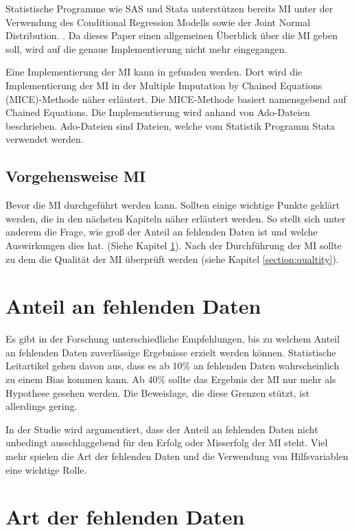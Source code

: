 Statistische Programme wie SAS und Stata unterstützen bereits MI unter der Verwendung des Conditional Regression Modells 
sowie der Joint Normal Distribution. \autocite[164]{Lee2014}. Da dieses Paper einen allgemeinen Überblick über die MI 
geben soll, wird auf die genaue Implementierung nicht mehr eingegangen. 

Eine Implementierung der MI kann in \textcite[]{Royston2005} gefunden werden. Dort wird die Implementierung der MI in der Multiple 
Imputation by Chained Equations (MICE)-Methode 
näher erläutert. Die MICE-Methode basiert namensgebend auf Chained Equations. Die Implementierung wird anhand von Ado-Dateien beschrieben.
Ado-Dateien sind Dateien, welche vom Statistik Programm Stata verwendet werden.

\subsection{Vorgehensweise MI}

Bevor die MI durchgeführt werden kann. Sollten einige wichtige Punkte geklärt werden, die in den nächsten 
Kapiteln näher erläutert werden. So stellt sich unter anderem die Frage, wie groß der Anteil an fehlenden 
Daten ist und welche Auswirkungen dies hat. (Siehe Kapitel \ref{section:missing_data}). Nach der 
Durchführung der MI sollte zu dem die Qualität der MI überprüft werden (siehe Kapitel \ref{section:qualtity}).


\section{Anteil an fehlenden Daten}
\label{section:missing_data}

Es gibt in der Forschung unterschiedliche Empfehlungen, bis zu welchem Anteil an fehlenden 
Daten zuverlässige Ergebnisse erzielt werden können. Statistische Leitartikel gehen davon aus, 
dass es ab 10\% an fehlenden Daten wahrscheinlich zu einem Bias kommen kann. Ab 40\% sollte 
das Ergebnis der MI nur mehr als Hypothese gesehen werden. Die Beweislage, die diese Grenzen 
stützt, ist allerdings gering. \autocite[63 f.]{Madley-Dowd2019}

In der Studie \textcite[]{Madley-Dowd2019} wird 
argumentiert, dass der Anteil an fehlenden Daten nicht unbedingt ausschlaggebend für den Erfolg oder Misserfolg der 
MI steht. Viel mehr spielen die Art der fehlenden Daten und die Verwendung von Hilfsvariablen eine wichtige Rolle. 

\section{Art der fehlenden Daten}
\label{section:descriptor_of_missingness}

